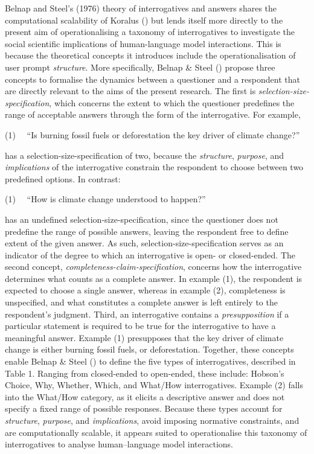 \documentclass[
  12pt,
]{article}
\begin{document}
Belnap and Steel's (1976) theory of interrogatives and answers shares the computational scalability of Koralus () but lends itself more directly to the present aim of operationalising a taxonomy of interrogatives to investigate the social scientific implications of human-language model interactions. This is because the theoretical concepts it introduces include the operationalisation of user prompt \emph{structure}. More specifically, Belnap \& Steel () propose three concepts to formalise the dynamics between a questioner and a respondent that are directly relevant to the aims of the present research. The first is \emph{selection-size-specification}, which concerns the extent to which the questioner predefines the range of acceptable answers through the form of the interrogative. For example,~

(1)~~ ``Is burning fossil fuels or deforestation the key driver of climate change?''

has a selection-size-specification of two, because the \emph{structure}, \emph{purpose}, and \emph{implications} of the interrogative constrain the respondent to choose between two predefined options. In contrast:

(1)~~ ``How is climate change understood to happen?''

has an undefined selection-size-specification, since the questioner does not predefine the range of possible answers, leaving the respondent free to define extent of the given answer. As such, selection-size-specification serves as an indicator of the degree to which an interrogative is open- or closed-ended. The second concept, \emph{completeness-claim-specification}, concerns how the interrogative determines what counts as a complete answer. In example (1), the respondent is expected to choose a single answer, whereas in example (2), completeness is unspecified, and what constitutes a complete answer is left entirely to the respondent's judgment. Third, an interrogative contains a \emph{presupposition} if a particular statement is required to be true for the interrogative to have a meaningful answer. Example (1) presupposes that the key driver of climate change is either burning fossil fuels, or deforestation. Together, these concepts enable Belnap \& Steel () to define the five types of interrogatives, described in Table 1. Ranging from closed-ended to open-ended, these include: Hobson's Choice, Why, Whether, Which, and What/How interrogatives. Example (2) falls into the What/How category, as it elicits a descriptive answer and does not specify a fixed range of possible responses. Because these types account for \emph{structure}, \emph{purpose}, and \emph{implications}, avoid imposing normative constraints, and are computationally scalable, it appears suited to operationalise this taxonomy of interrogatives to analyse human--language model interactions.
\end{document}
